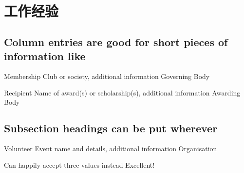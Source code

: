 \section{\kaishu 工作经验}

\subsection{Column entries are good for short pieces of information like}

  	{Membership}
    {Club or society, additional information}
    {Governing Body}

  	{Recipient}
  	{Name of award(s) or scholarship(s), additional information}
  	{Awarding Body}

\subsection{Subsection headings can be put wherever}

    {Volunteer}
    {Event name and details, additional information}
    {Organisation}
    
	{Can happily accept three values instead}
	{Excellent!}